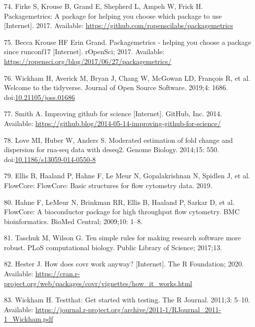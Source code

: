 \documentclass[10pt,letterpaper]{article}
\begin{document}
\leavevmode\hypertarget{ref-packagemetrics}{}%
74. Firke S, Krouse B, Grand E, Shepherd L, Ampeh W, Frick H.
Packagemetrics: A package for helping you choose which package to use
{[}Internet{]}. 2017. Available:
\url{https://github.com/ropenscilabs/packagemetrics}

\leavevmode\hypertarget{ref-packagemetricsblog}{}%
75. Becca Krouse HF Erin Grand. Packagemetrics - helping you choose a
package since runconf17 {[}Internet{]}. rOpenSci; 2017. Available:
\url{https://ropensci.org/blog/2017/06/27/packagemetrics/}

\leavevmode\hypertarget{ref-tidyverse}{}%
76. Wickham H, Averick M, Bryan J, Chang W, McGowan LD, François R, et
al. Welcome to the tidyverse. Journal of Open Source Software. 2019;4:
1686.
doi:\href{https://doi.org/10.21105/joss.01686}{10.21105/joss.01686}

\leavevmode\hypertarget{ref-smith2014}{}%
77. Smith A. Improving github for science {[}Internet{]}. GitHub, Inc.
2014. Available:
\url{https://github.blog/2014-05-14-improving-github-for-science/}

\leavevmode\hypertarget{ref-DESeq2}{}%
78. Love MI, Huber W, Anders S. Moderated estimation of fold change and
dispersion for rna-seq data with deseq2. Genome Biology. 2014;15: 550.
doi:\href{https://doi.org/10.1186/s13059-014-0550-8}{10.1186/s13059-014-0550-8}

\leavevmode\hypertarget{ref-flowCore}{}%
79. Ellis B, Haaland P, Hahne F, Le Meur N, Gopalakrishnan N, Spidlen J,
et al. FlowCore: FlowCore: Basic structures for flow cytometry data.
2019.

\leavevmode\hypertarget{ref-hahne2009}{}%
80. Hahne F, LeMeur N, Brinkman RR, Ellis B, Haaland P, Sarkar D, et al.
FlowCore: A bioconductor package for high throughput flow cytometry. BMC
bioinformatics. BioMed Central; 2009;10: 1--8.

\leavevmode\hypertarget{ref-taschuk2017}{}%
81. Taschuk M, Wilson G. Ten simple rules for making research software
more robust. PLoS computational biology. Public Library of Science;
2017;13.

\leavevmode\hypertarget{ref-hester2020}{}%
82. Hester J. How does covr work anyway? {[}Internet{]}. The R
Foundation; 2020. Available:
\url{https://cran.r-project.org/web/packages/covr/vignettes/how_it_works.html}

\leavevmode\hypertarget{ref-wickham2011}{}%
83. Wickham H. Testthat: Get started with testing. The R Journal.
2011;3: 5--10. Available:
\url{https://journal.r-project.org/archive/2011-1/RJournal_2011-1_Wickham.pdf}
\end{document}
